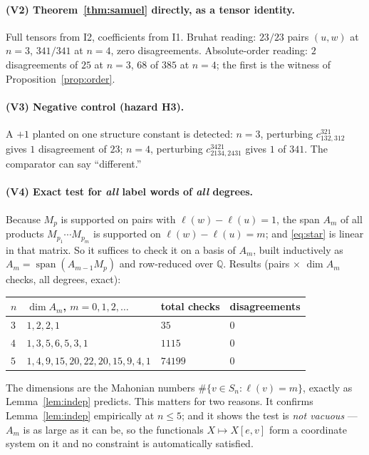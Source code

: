 \documentclass[11pt]{article}
\theoremstyle{plain}
\theoremstyle{definition}
\DeclareMathOperator{\len}{\ell}
\begin{document}
\paragraph{(V2) Theorem~\ref{thm:samuel} directly, as a tensor identity.}
Full tensors from I2, coefficients from I1. Bruhat reading: $23/23$ pairs
$(u,w)$ at $n=3$, $341/341$ at $n=4$, zero disagreements. Absolute-order
reading: $2$ disagreements of $25$ at $n=3$, $68$ of $385$ at $n=4$; the first
is the witness of Proposition~\ref{prop:order}.

\paragraph{(V3) Negative control (hazard H3).} A $+1$ planted on one structure
constant is detected: $n=3$, perturbing $c^{321}_{132,312}$ gives $1$
disagreement of $23$; $n=4$, perturbing $c^{3421}_{2134,2431}$ gives $1$ of
$341$. The comparator can say ``different.''

\paragraph{(V4) Exact test for \emph{all} label words of \emph{all} degrees.}
Because $M_{p}$ is supported on pairs with $\len(w)-\len(u)=1$, the span
$A_{m}$ of all products $M_{p_{1}}\cdots M_{p_{m}}$ is supported on
$\len(w)-\len(u)=m$; and \eqref{eq:star} is linear in that matrix. So it
suffices to check it on a basis of $A_{m}$, built inductively as
$A_{m}=\operatorname{span}(A_{m-1}M_{p})$ and row-reduced over $\mathbb{Q}$.
Results (pairs $\times$ $\dim A_{m}$ checks, all degrees, exact):

\begin{center}
\begin{tabular}{llll}
\hline
$n$ & $\dim A_{m}$, $m=0,1,2,\dots$ & total checks & disagreements\\
\hline
$3$ & $1,2,2,1$ & $35$ & $0$\\
$4$ & $1,3,5,6,5,3,1$ & $1115$ & $0$\\
$5$ & $1,4,9,15,20,22,20,15,9,4,1$ & $74199$ & $0$\\
\hline
\end{tabular}
\end{center}

\noindent The dimensions are the Mahonian numbers
$\#\{v\in S_{n}:\len(v)=m\}$, exactly as Lemma~\ref{lem:indep} predicts.
This matters for two reasons. It confirms Lemma~\ref{lem:indep} empirically at
$n\le5$; and it shows the test is \emph{not vacuous} --- $A_{m}$ is as large as
it can be, so the functionals $X\mapsto X[e,v]$ form a coordinate system on it
and no constraint is automatically satisfied.
\end{document}
